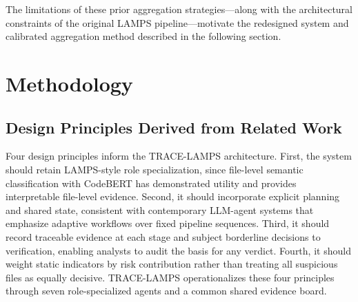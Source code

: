 \documentclass[conference,a4paper]{IEEEtran}
\newcommand{\tracelamps}{TRACE-LAMPS}
\newcommand{\codebert}{CodeBERT}
\begin{document}
The limitations of these prior aggregation strategies---along with the architectural
constraints of the original LAMPS pipeline---motivate the redesigned system and
calibrated aggregation method described in the following section.


\section{Methodology}

\subsection{Design Principles Derived from Related Work}
Four design principles inform the \tracelamps{} architecture. First, the system should
retain LAMPS-style role specialization, since file-level semantic classification with
\codebert{} has demonstrated utility and provides interpretable file-level evidence.
Second, it should incorporate explicit planning and shared state, consistent with
contemporary LLM-agent systems that emphasize adaptive workflows over fixed pipeline
sequences. Third, it should record traceable evidence at each stage and subject
borderline decisions to verification, enabling analysts to audit the basis for any verdict.
Fourth, it should weight static indicators by risk contribution rather than treating all
suspicious files as equally decisive. \tracelamps{} operationalizes these four principles
through seven role-specialized agents and a common shared evidence board.
\end{document}
